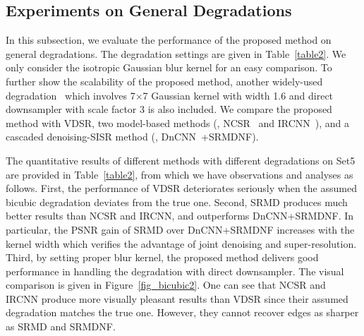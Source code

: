 \documentclass[10pt,twocolumn,letterpaper]{article}
\begin{document}
\subsection{Experiments on General Degradations}
In this subsection, we evaluate the performance of the proposed method on general degradations.
The degradation settings are given in Table~\ref{table2}.
We only consider the isotropic Gaussian blur kernel for an easy comparison.
To further show the scalability of the proposed method, another widely-used degradation~\cite{dong2013nonlocally} which involves 7$\times$7 Gaussian kernel
with width 1.6 and direct downsampler with scale factor 3 is also included.
We compare the proposed method with VDSR, two model-based methods (\ie, NCSR~\cite{dong2013nonlocally} and IRCNN~\cite{zhang2017learning}), and a cascaded denoising-SISR method (\ie, DnCNN~\cite{zhang2017beyond}+SRMDNF).


The quantitative results of different methods with different degradations on Set5 are provided in Table~\ref{table2}, from which we have observations and analyses as follows.
First, the performance of VDSR deteriorates seriously when the assumed bicubic degradation deviates from the true one.
Second, SRMD produces much better results than NCSR and IRCNN, and outperforms DnCNN+SRMDNF. In particular, the PSNR gain of SRMD over DnCNN+SRMDNF increases with the kernel width
which verifies the advantage of joint denoising and super-resolution.
Third, by setting proper blur kernel, the proposed method delivers good performance in handling the degradation with direct downsampler. The visual comparison is given in Figure~\ref{fig_bicubic2}.
One can see that NCSR and IRCNN produce more visually pleasant results than VDSR since their assumed degradation matches the true one. However, they cannot recover edges as sharper as SRMD and SRMDNF.
\end{document}
